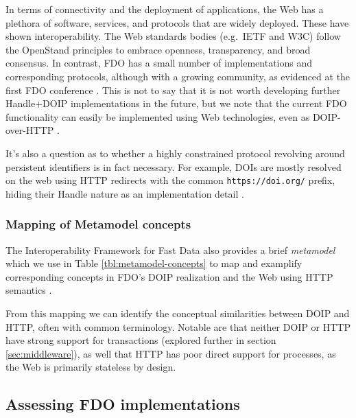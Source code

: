 \documentclass[fleqn,10pt,lineno]{wlpeerjlua}
\begin{document}
In terms of connectivity and the deployment of applications, the Web has a plethora of software, services, and protocols that are widely deployed. These have shown interoperability. The Web standards bodies (e.g.~IETF and W3C) follow the OpenStand principles \autocite{ModernStandardsParadigm} to embrace openness, transparency, and broad consensus. In contrast, FDO has a small number of implementations and corresponding protocols, although with a growing community, as evidenced at the first FDO conference \autocite{looFirstInternationalConference2022}. This is not to say that it is not worth developing further Handle+DOIP implementations in the future, but we note that the current FDO functionality can easily be implemented using Web technologies, even as DOIP-over-HTTP \autocite{DOIPAPIHTTPa}.

It's also a question as to whether a highly constrained protocol revolving around persistent identifiers is in fact necessary. For example, DOIs are mostly resolved on the web \autocite{DOIResolutionDocumentation} using HTTP redirects with the common \texttt{https://doi.org/} prefix, hiding their Handle nature as an implementation detail \autocite{DOIHandbookResolution}.

\hypertarget{mapping-of-metamodel-concepts}{%
\subsubsection*{Mapping of Metamodel concepts}\label{mapping-of-metamodel-concepts}}

The Interoperability Framework for Fast Data also provides a brief \emph{metamodel} which we use in Table \ref{tbl:metamodel-concepts} to map and examplify corresponding concepts in FDO's DOIP realization and the Web using HTTP semantics \autocite{rfc9110}.



From this mapping we can identify the conceptual similarities between DOIP and HTTP, often with common terminology. Notable are that neither DOIP or HTTP have strong support for transactions (explored further in section \ref{sec:middleware}), as well that HTTP has poor direct support for processes, as the Web is primarily stateless by design.

\hypertarget{sec:doip-fdo-compare}{%
\subsection*{Assessing FDO implementations}\label{sec:doip-fdo-compare}}
\end{document}
